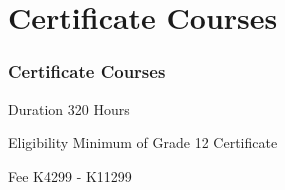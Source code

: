 \section{Certificate Courses}

\begin{frame}
\frametitle{Certificate Courses}

\begin{block}{Duration}
320 Hours
\end{block}

\begin{alertblock}{Eligibility}
Minimum of Grade 12 Certificate
\end{alertblock}


\begin{exampleblock}{Fee}
K4299 - K11299
\end{exampleblock}

\end{frame}